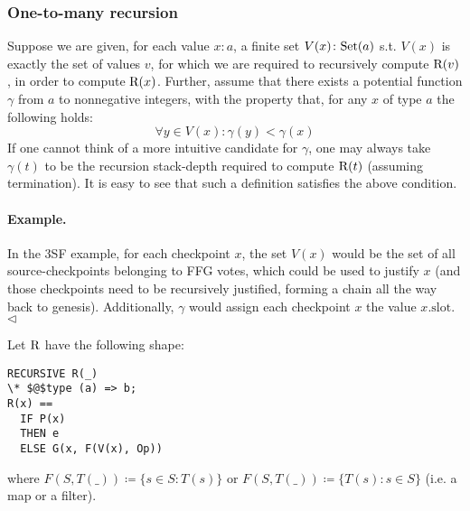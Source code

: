 \subsubsection{One-to-many recursion}

Suppose we are given, for each value $x: a$, a finite set $V(x)\colon \mathrm{Set}(a)$ s.t. $V(x)$ is exactly the set of values $v$, for which we are required to recursively compute $\mathrm{R}(v)$, in order to compute $\mathrm{R}(x)$. 
Further, assume that there exists a potential function $\gamma$ from $a$ to nonnegative integers, with the property that, for any $x$ of type $a$ the following holds:
\[
\forall y \in V(x)\colon \gamma(y) < \gamma(x) 
\]
%
If one cannot think of a more intuitive candidate for $\gamma$, one may always take $\gamma(t)$ to be the recursion stack-depth required to compute $\mathrm{R}(t)$ (assuming termination). It is easy to see that such a definition satisfies the above condition.

\paragraph{Example.} In the 3SF example, for each checkpoint $x$, the set $V(x)$ would be the set of all source-checkpoints belonging to FFG votes, which could be used to justify $x$ (and those checkpoints need to be recursively justified, forming a chain all the way back to genesis). Additionally, $\gamma$ would assign each checkpoint $x$ the value $x.\text{slot}$. \hfill $\triangleleft$

\noindent Let $\mathrm{R}$ have the following shape:
\begin{lstlisting}[language=tla,columns=fullflexible]
RECURSIVE R(_)
\* $@$type (a) => b;
R(x) ==
  IF P(x)
  THEN e
  ELSE G(x, F(V(x), Op))
\end{lstlisting}
%
where $F(S, T(\_)) \coloneqq \{s \in S\colon T(s)\}$ or $F(S, T(\_)) \coloneqq \{T(s)\colon s \in S\}$ (i.e. a map or a filter).
%

